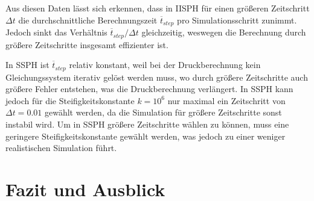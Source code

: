 \documentclass{scrreprt}
\begin{document}
Aus diesen Daten lässt sich erkennen,
dass in IISPH für einen größeren Zeitschritt $\Delta t$ die durchschnittliche Berechnungszeit $\overline{t}_{step}$ pro Simulationsschritt zunimmt.
Jedoch sinkt das Verhältnis $\overline{t}_{step} / \Delta t$ gleichzeitig, weswegen die Berechnung durch größere Zeitschritte insgesamt effizienter ist.

In SSPH ist $\overline{t}_{step}$ relativ konstant, weil bei der Druckberechnung kein Gleichungssystem iterativ gelöst werden muss,
wo durch größere Zeitschritte auch größere Fehler entstehen, was die Druckberechnung verlängert.
In SSPH kann jedoch für die Steifigkeitskonstante $k = 10^6$ nur maximal ein Zeitschritt von $\Delta t = 0.01$ gewählt werden,
da die Simulation für größere Zeitschritte sonst instabil wird.
Um in SSPH größere Zeitschritte wählen zu können,  muss eine geringere Steifigkeitskonstante gewählt werden, was jedoch zu einer weniger realistischen Simulation führt.

\chapter{Fazit und Ausblick}


\end{document}
